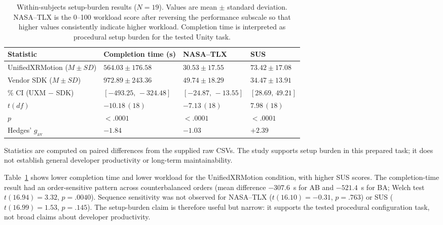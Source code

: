 \documentclass[runningheads]{llncs}
\begin{document}
\begin{table}[t]
	\caption{Within-subjects setup-burden results ($N=19$). Values are mean $\pm$ standard deviation. NASA--TLX is the 0--100 workload score after reversing the performance subscale so that higher values consistently indicate higher workload. Completion time is interpreted as procedural setup burden for the tested Unity task.}
	\label{tab:user-results}
	\centering
	\scriptsize
	\setlength{\tabcolsep}{3.5pt}
	\renewcommand{\arraystretch}{1.08}
	\begin{tabularx}{\textwidth}{@{}>{\raggedright\arraybackslash}X
		>{\centering\arraybackslash}p{28mm}
		>{\centering\arraybackslash}p{24mm}
		>{\centering\arraybackslash}p{23mm}@{}}
		\toprule
		Statistic & Completion time (s)   & NASA--TLX & SUS \\
		\midrule
		UnifiedXRMotion ($M\!\pm\!SD$)
		          & $564.03\!\pm\!176.58$
		          & $30.53\!\pm\!17.55$
		          & $73.42\!\pm\!17.08$                     \\
		Vendor SDK ($M\!\pm\!SD$)
		          & $972.89\!\pm\!243.36$
		          & $49.74\!\pm\!18.29$
		          & $34.47\!\pm\!13.91$                     \\
		95\% CI (UXM $-$ SDK)
		          & $[-493.25,\,-324.48]$
		          & $[-24.87,\,-13.55]$
		          & $[28.69,\,49.21]$                       \\
		$t(df)$
		          & $-10.18\,(18)$
		          & $-7.13\,(18)$
		          & $7.98\,(18)$                            \\
		$p$
		          & $<.0001$
		          & $<.0001$
		          & $<.0001$                                \\
		Hedges' $g_{\mathrm{av}}$
		          & $-1.84$
		          & $-1.03$
		          & $+2.39$                                 \\
		\bottomrule
	\end{tabularx}

	\vspace{2pt}
	{\footnotesize Statistics are computed on paired differences from the supplied raw CSVs. The study supports setup burden in this prepared task; it does not establish general developer productivity or long-term maintainability.\par}
\end{table}

Table~\ref{tab:user-results} shows lower completion time and lower workload for the UnifiedXRMotion condition, with higher SUS scores. The completion-time result had an order-sensitive pattern across counterbalanced orders (mean difference $-307.6$~s for AB and $-521.4$~s for BA; Welch test $t(16.94)=3.32$, $p=.0040$). Sequence sensitivity was not observed for NASA--TLX ($t(16.10)=-0.31$, $p=.763$) or SUS ($t(16.99)=1.53$, $p=.145$). The setup-burden claim is therefore useful but narrow: it supports the tested procedural configuration task, not broad claims about developer productivity.
\end{document}
